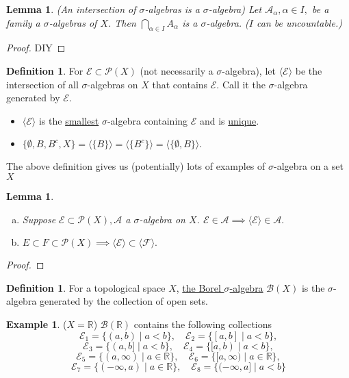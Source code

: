 \documentclass{report}
\newcommand{\R}{\mathbb{R}}
\newtheorem{lemma}[theorem]{Lemma}
\theoremstyle{definition}
\newtheorem{definition}[theorem]{Definition}
\newtheorem{example}[theorem]{Example}
\theoremstyle{remark}
\begin{document}
\begin{lemma}(An intersection of $\sigma$-algebras is a $\sigma$-algebra)
Let $\mathcal{A}_\alpha, \alpha \in I,$ be a family a $\sigma$-algebras of $X$. Then $\bigcap_{\alpha \in I} A_\alpha$ is a $\sigma$-algebra. ($I$ can be uncountable.)
\end{lemma}
\begin{proof}
DIY
\end{proof}

\begin{definition}
For $\mathcal{E} \subset \mathcal{P}(X)$ (not necessarily a $\sigma$-algebra), let $\langle \mathcal{E}\rangle$ be the intersection of all $\sigma$-algebras on $X$ that contains $\mathcal{E}.$ Call it the $\sigma$-algebra generated by $\mathcal{E}.$
\end{definition}
\begin{itemize}
\item $\langle \mathcal{E}\rangle$ is the \underline{smallest} $\sigma$-algebra containing $\mathcal{E}$ and is \underline{unique}.
\item $\{\emptyset, B, B^c, X\} = \langle \{B\} \rangle = \langle \{B^c\}\rangle = \langle \{\emptyset, B\}\rangle.$
\end{itemize}

The above definition gives us (potentially) lots of examples of $\sigma$-algebra on a set $X$

\begin{lemma}\label{le:alg}
\begin{enumerate}[(a)]
\item
	Suppose $\mathcal{E} \subset \mathcal{P}(X), \mathcal{A}$ a $\sigma$-algebra on $X$. $\mathcal{E} \in \mathcal{A} \implies \langle\mathcal{E}\rangle \in \mathcal{A}.$
\item
	$E \subset F \subset \mathcal{P}(X) \implies \langle \mathcal{E} \rangle \subset \langle\mathcal{F}\rangle.$
\end{enumerate}
\end{lemma}
\begin{proof}

\end{proof}

\begin{definition}
For a topological space $X$, \underline{the Borel $\sigma$-algebra} $\mathcal{B}(X)$ is the $\sigma$-algebra generated by the collection of open sets.
\end{definition}

\begin{example}($X = \R$)
$\mathcal{B}(\R)$ contains the following collections
\[\mathcal{E}_1 = \{(a, b) \mid a < b\}, \quad \mathcal{E}_2 = \{[a, b] \mid a < b\},\]
\[\mathcal{E}_3 = \{(a, b] \mid a < b\}, \quad \mathcal{E}_4 = \{[a, b) \mid a < b\},\]
\[\mathcal{E}_5 = \{(a, \infty) \mid a \in \R\}, \quad \mathcal{E}_6 = \{[a, \infty) \mid a \in \R \},\]
\[\mathcal{E}_7 = \{(-\infty, a) \mid a \in \R\}, \quad \mathcal{E}_8 = \{(-\infty, a] \mid a < b\}\]
\end{example}
\end{document}
